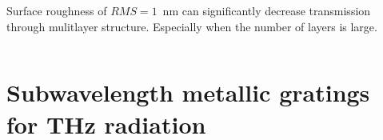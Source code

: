 \documentclass{beamer}
\begin{document}
\begin{frame}[t]
\begin{columns}
\begin{column}{0.5\textwidth}
				Surface roughness of $RMS=1$~nm can significantly decrease transmission through mulitlayer structure. Especially when the number of layers is large.
			
		\end{column}
	
	\end{columns}

	{\tiny \cite{pastuszczak2013engineering}}
		
\end{frame}



\section{Subwavelength metallic gratings for THz radiation}
\end{document}
